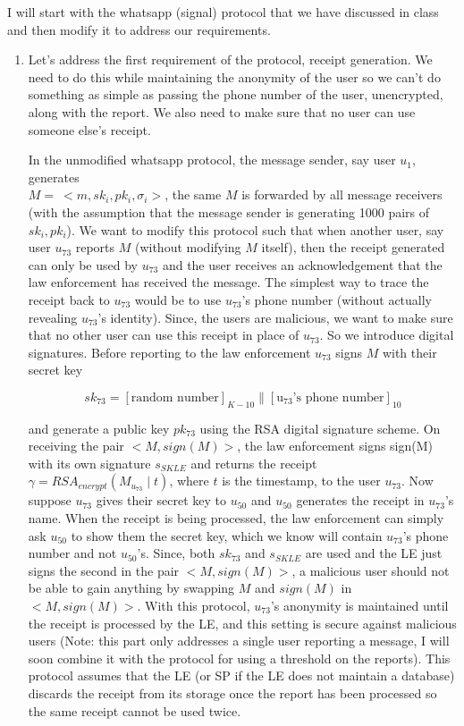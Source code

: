 \documentclass{ashoka-crypto}
\begin{document}
I will start with the whatsapp (signal) protocol that we have discussed in class and then modify it to address our requirements.
\begin{enumerate}
\item Let's address the first requirement of the protocol, receipt generation. We need to do this while maintaining the anonymity of the user so we can't do something as simple as passing the phone number of the user, unencrypted, along with the report. We also need to make sure that no user can use someone else's receipt.

In the unmodified whatsapp protocol, the message sender, say user $u_1$, generates \\
$M =\> <m, sk_{i}, pk_{i}, \sigma_i>$, the same $M$ is forwarded by all message receivers (with the assumption that the message sender is generating 1000 pairs of $sk_{i}, pk_{i}$). We want to modify this protocol such that when another user, say user $u_{73}$ reports $M$ (without modifying $M$ itself), then the receipt generated can only be used by $u_{73}$ and the user receives an acknowledgement that the law enforcement has received the message. The simplest way to trace the receipt back to $u_{73}$ would be to use $u_{73}$'s phone number (without actually revealing $u_{73}$'s identity). Since, the users are malicious, we want to make sure that no other user can use this receipt in place of $u_{73}$. So we introduce digital signatures. Before reporting to the law enforcement $u_{73}$ signs $M$ with their secret key 

\[sk_{73} = [\text{random number}]_{K-10} \| [\text{u}_{73}\text{'s phone number}]_{10}\]

and generate a public key $pk_{73}$ using the RSA digital signature scheme. On receiving the pair $<M,sign(M)>$, the law enforcement signs sign(M) with its own signature $s_{SKLE}$ and returns the receipt $\gamma = RSA_{encrypt}(M_{u_{73}} \mid t )$, where $t$ is the timestamp, to the user $u_{73}$. Now suppose $u_{73}$ gives their secret key to $u_{50}$ and $u_{50}$ generates the receipt in $u_{73}$'s name. When the receipt is being processed, the law enforcement can simply ask $u_{50}$ to show them the secret key, which we know will contain $u_{73}$'s phone number and not $u_{50}$'s. Since, both $sk_{73}$ and $s_{SKLE}$ are used and the LE just signs the second in the pair $<M,sign(M)>$, a malicious user should not be able to gain anything by swapping $M$ and $sign(M)$ in $<M,sign(M)>$. With this protocol, $u_{73}$'s anonymity is maintained until the receipt is processed by the LE, and this setting is secure against malicious users (Note: this part only addresses a single user reporting a message, I will soon combine it with the protocol for using a threshold on the reports). This protocol assumes that the LE (or SP if the LE does not maintain a database) discards the receipt from its storage once the report has been processed so the same receipt cannot be used twice.


\end{enumerate}
\end{document}
